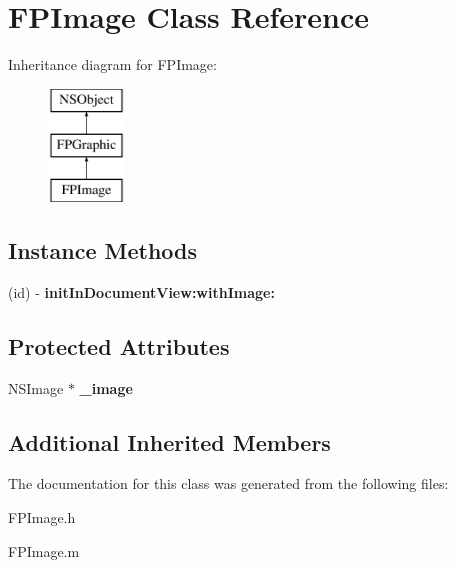 \hypertarget{interface_f_p_image}{}\section{F\+P\+Image Class Reference}
\label{interface_f_p_image}
Inheritance diagram for F\+P\+Image\+:\begin{figure}[H]
\begin{center}
\leavevmode
\includegraphics[height=3.000000cm]{interface_f_p_image}
\end{center}
\end{figure}
\subsection*{Instance Methods}
\begin{DoxyCompactItemize}
\item 
\mbox{\label{interface_f_p_image_a131db88dc4db503425fec0f9a0cf7d86}} 
(id) -\/ {\bfseries init\+In\+Document\+View\+:with\+Image\+:}
\end{DoxyCompactItemize}
\subsection*{Protected Attributes}
\begin{DoxyCompactItemize}
\item 
\mbox{\label{interface_f_p_image_a9d580ec5a9030c5f732c9285352bcaf7}} 
N\+S\+Image $\ast$ {\bfseries \+\_\+image}
\end{DoxyCompactItemize}
\subsection*{Additional Inherited Members}


The documentation for this class was generated from the following files\+:\begin{DoxyCompactItemize}
\item 
F\+P\+Image.\+h\item 
F\+P\+Image.\+m\end{DoxyCompactItemize}
